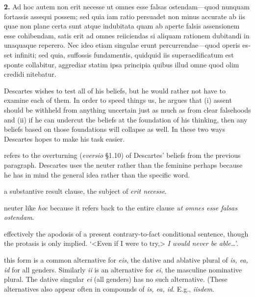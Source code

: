 
\clearpage

\beginnumbering
\pstart
\begin{latin}
    \textenglish{\textbf{2.}} Ad hoc autem non erit necesse ut omnes esse falsas ostendam---quod nunquam fortassis assequi possem; sed quia iam ratio persuadet non minus accurate ab iis quae non plane certa sunt atque indubitata quam ab aperte falsis assensionem esse cohibendam, satis erit ad omnes reiiciendas si aliquam rationem dubitandi in unaquaque reperero. Nec ideo etiam singulae erunt percurrendae---quod operis esset infiniti; sed quia, suffossis fundamentis, quidquid iis superaedificatum est sponte collabitur, aggrediar statim ipsa principia quibus illud omne quod olim credidi nitebatur.
\end{latin}
\pend
\endnumbering

\prenotes

Descartes wishes to test all of his beliefs, but he would rather not have to examine each of them. In order to speed things us, he argues that (i) assent should be withheld from anything uncertain just as much as from clear falsehoods and (ii) if he can undercut the beliefs at the foundation of his thinking, then any beliefs based on those foundations will collapse as well. In these two ways Descartes hopes to make his task easier.

 refers to the overturning (\textit{eversio} §1.10) of Descartes' beliefs from the previous paragraph. Descartes uses the neuter rather than the feminine perhaps because he has in mind the general idea rather than the specific word.

 a substantive result clause, the subject of \textit{erit necesse}.

 neuter like \textit{hoc} because it refers back to the entire clause \textit{ut omnes esse falsas ostendam}.

 effectively the apodosis of a present contrary-to-fact conditional sentence, though the protasis is only implied. `<Even if I were to try,> \textit{I would never be able\dots}'.

 this form is a common alternative for \textit{eis}, the dative and ablative plural of \textit{is, ea, id} for all genders. Similarly \textit{ii} is an alternative for \textit{ei}, the masculine nominative plural. The dative singular \textit{ei} (all genders) has no such alternative. (These alternatives also appear often in compounds of \textit{is, ea, id}. E.g., \textit{iisdem}.

